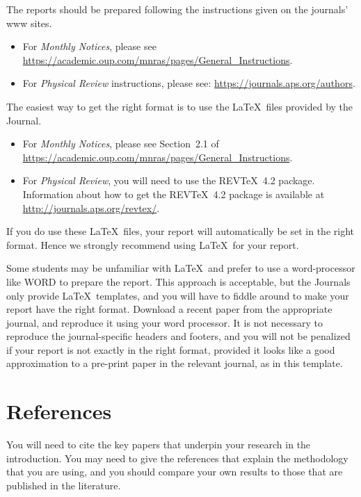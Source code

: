 \documentclass[a4paper,fleqn,usenatbib]{mnras}
\begin{document}
The reports should be prepared following the instructions given on the journals' www sites.
\begin{itemize}
\item For \textit{Monthly Notices}, please see \url{https://academic.oup.com/mnras/pages/General_Instructions}.
\item For \textit{Physical Review} instructions, please see: \url{https://journals.aps.org/authors}.
\end{itemize}
The easiest way to get the right format is to use the \LaTeX\  files provided by the Journal.
\begin{itemize}
\item For \textit{Monthly Notices}, please see Section~2.1 of \url{https://academic.oup.com/mnras/pages/General_Instructions}. 
\item For \textit{Physical Review}, you  will need to use the REV\TeX~4.2 package. Information about how to get the REV\TeX~4.2 package is available at \url{http://journals.aps.org/revtex/}.
\end{itemize}
 If you do use these \LaTeX\ files, your report will automatically be set in the right format. Hence we strongly recommend using \LaTeX\ for your report.
 
 Some students may be unfamiliar with  \LaTeX\ and prefer to use a word-processor like WORD to prepare the report. This approach is acceptable, but the Journals only provide \LaTeX\ templates, and you will have to fiddle around to make your report have the right format. Download a recent paper from the appropriate journal, and reproduce it using your word processor. It is not necessary to reproduce the journal-specific headers and footers, and you will not be penalized if your report is not exactly in the right format, provided it looks like a good approximation to a pre-print paper in the relevant journal, as in this template. 








\section{References}
\label{sec:refs}


 You will need to cite the key papers that underpin your research in the introduction. You may need to give the references that explain the methodology that you are using, and you should  compare your own results to those that are published in the literature.
\end{document}
